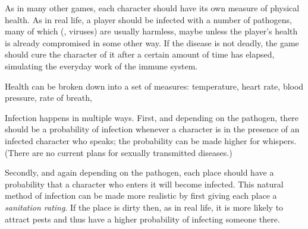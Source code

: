 As in many other games, each character should have its own measure of
physical health. As in real life, a player should be infected with a
number of pathogens, many of which (\eg, viruses) are usually
harmless, maybe unless the player's health is already compromised in
some other way. If the disease is not deadly, the game should cure the
character of it after a certain amount of time has elapsed, simulating
the everyday work of the immune system.

Health can be broken down into a set of measures: temperature, heart
rate, blood pressure, rate of breath, \etc\

Infection happens in multiple ways. First, and depending on the
pathogen, there should be a probability of infection whenever a
character is in the presence of an infected character who speaks; the
probability can be made higher for whispers. (There are no current
plans for sexually transmitted diseases.)

Secondly, and again depending on the pathogen, each place should have
a probability that a character who enters it will become
infected. This natural method of infection can be made more realistic
by first giving each place a {\em sanitation rating}. If the place is
dirty then, as in real life, it is more likely to attract pests and
thus have a higher probability of infecting someone there.
